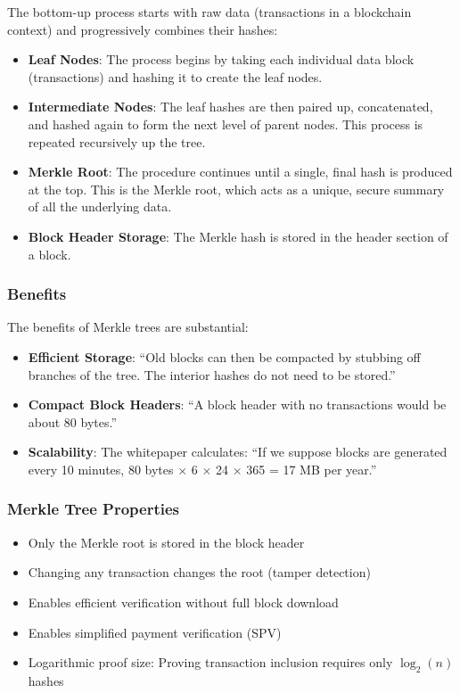 The bottom-up process starts with raw data (transactions in a blockchain context) and progressively combines their hashes:

\begin{itemize}
  \item \textbf{Leaf Nodes}: The process begins by taking each individual data block (transactions) and hashing it to create the leaf nodes.

  \item \textbf{Intermediate Nodes}: The leaf hashes are then paired up, concatenated, and hashed again to form the next level of parent nodes. This process is repeated recursively up the tree.

  \item \textbf{Merkle Root}: The procedure continues until a single, final hash is produced at the top. This is the Merkle root, which acts as a unique, secure summary of all the underlying data.

  \item \textbf{Block Header Storage}: The Merkle hash is stored in the header section of a block.
\end{itemize}

\subsubsection{Benefits}

The benefits of Merkle trees are substantial:

\begin{itemize}
  \item \textbf{Efficient Storage}: ``Old blocks can then be compacted by stubbing off branches of the tree. The interior hashes do not need to be stored.''

  \item \textbf{Compact Block Headers}: ``A block header with no transactions would be about 80 bytes.''

  \item \textbf{Scalability}: The whitepaper calculates: ``If we suppose blocks are generated every 10 minutes, 80 bytes {$\times$} 6 {$\times$} 24 {$\times$} 365 = 17 MB per year.''
\end{itemize}

\subsubsection{Merkle Tree Properties}

\begin{itemize}
  \item Only the Merkle root is stored in the block header
  \item Changing any transaction changes the root (tamper detection)
  \item Enables efficient verification without full block download
  \item Enables simplified payment verification (SPV)
  \item Logarithmic proof size: Proving transaction inclusion requires only $\log_2(n)$ hashes
\end{itemize}

